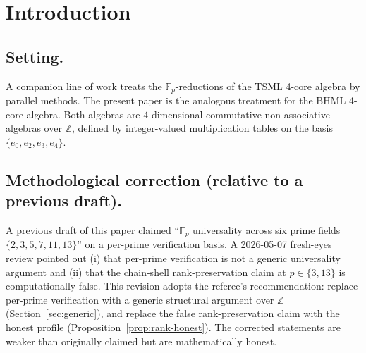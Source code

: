 \documentclass[11pt,reqno]{amsart}
\theoremstyle{plain}
\theoremstyle{definition}
\theoremstyle{remark}
\newcommand{\Z}{\mathbb{Z}}
\newcommand{\F}{\mathbb{F}}
\newcommand{\TSML}{\mathrm{TSML}}
\newcommand{\BHML}{\mathrm{BHML}}
\begin{document}
\begin{abstract}
\smallskip\noindent
\textbf{Scope and tier discipline.} \emph{Proven.} The four
characteristic-independent invariants of $V^{\BHML}_{\F_{p}}$ stated
in Theorem~\ref{thm:universality}; the rank-preservation profile of
Proposition~\ref{prop:rank-honest}; the
$\det(\BHML_{8}^{\circ}) = +70$ integer identity. \emph{Computed.}
Reference Python scripts (\texttt{bhml\_fp\_universality.py} and
\texttt{bhml\_chain\_shells.py}, runtime $< 30$\,s combined) verify
all numerical claims by sympy/numpy linear algebra. \emph{Structural
rhyme.} The skeleton invariants resemble those of the parallel
$V^{\TSML}_{\F_{p}}$ algebra studied in companion
work (in preparation, parallel TSML side); the resemblance reflects
the shared near-absorber structure on $e_{0}$ but the two algebras
are not isomorphic. \emph{Open.} Whether $\det(\BHML_{8}^{\circ}) =
\binom{8}{4}$ admits a Lindström--Gessel--Viennot or
Cauchy--Binet-style structural derivation, or is a small-integer
coincidence; a structural classification of the idempotent count as
a function of $p$.
\end{abstract}

\maketitle

\tableofcontents

\section{Introduction}
\label{sec:intro}

\subsection{Setting.}
A companion line of work treats the $\F_{p}$-reductions of the
$\TSML$ 4-core algebra by parallel methods. The present paper is the
analogous treatment for the $\BHML$ 4-core algebra. Both algebras are
$4$-dimensional commutative non-associative algebras over $\Z$,
defined by integer-valued multiplication tables on the basis
$\{e_{0}, e_{2}, e_{3}, e_{4}\}$.

\subsection{Methodological correction (relative to a previous draft).}
A previous draft of this paper claimed ``$\F_{p}$ universality across
six prime fields $\{2, 3, 5, 7, 11, 13\}$'' on a per-prime
verification basis. A 2026-05-07 fresh-eyes review pointed out (i)
that per-prime verification is not a generic universality argument
and (ii) that the chain-shell rank-preservation claim at $p \in
\{3, 13\}$ is computationally false. This revision adopts the
referee's recommendation: replace per-prime verification with a
generic structural argument over $\Z$ (Section~\ref{sec:generic}),
and replace the false rank-preservation claim with the honest
profile (Proposition~\ref{prop:rank-honest}). The corrected
statements are weaker than originally claimed but are mathematically
honest.
\end{document}
